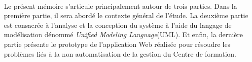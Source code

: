 \paragraph{}
Le présent mémoire s'articule principalement autour de trois parties. Dans la première partie, il sera abordé le contexte général de l'étude. La deuxième partie est consacrée à l'analyse et la conception du système à l'aide du langage de modélisation dénommé \emph{Unified Modeling Language}(UML). Et enfin, la dernière partie présente le prototype de l'application Web réalisée pour résoudre les problèmes liés à la non automatisation de la gestion du Centre de formation.



